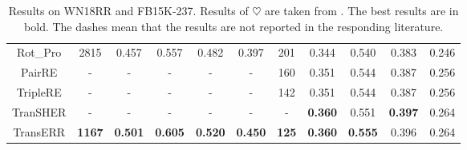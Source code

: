 \documentclass[10pt, a4paper]{article}
\begin{document}
\begin{table}[!htb]
{\begin{tabular}{ccccccccccc}
			Rot\_Pro           & 2815                                & 0.457                                  & 0.557          & 0.482          & 0.397          & 201          & 0.344          & 0.540          & 0.383          & 0.246          \\
			PairRE             &     -                               & -                                      & -              & -              & -              & 160          & 0.351          & 0.544          & 0.387          & 0.256          \\ 
			TripleRE   & -                                     & -                                   & -              & -              & -              & 142   & 0.351          & 0.544          & 0.387          & 0.256          \\
			TranSHER   & -                                     & -                                   & -              & -              & -              & -   & \textbf{0.360}          & 0.551          & \textbf{0.397}          & 0.264          \\  \hline
			TransERR            & \textbf{1167}                       & \textbf{0.501}                         & \textbf{0.605} & \textbf{0.520} & \textbf{0.450} & \textbf{125} & \textbf{0.360} & \textbf{0.555} & 0.396 & 0.264          \\ \hline
		\end{tabular}}
	\caption{Results on WN18RR and FB15K-237. Results of $\heartsuit $ are taken from  \citet{31sun2019rotate}. The best results are in bold. The dashes mean that the results are not reported in the responding literature.}
	\label{tab:wn18rr+fb237}
\end{table}
\end{document}
